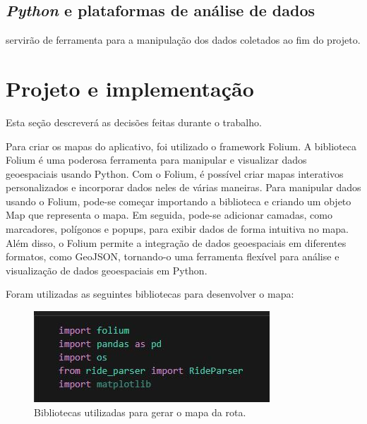      \subsection{\textit{Python} e plataformas de análise de dados} servirão de ferramenta para a manipulação dos dados coletados ao fim do projeto.


\section{Projeto e implementação}
Esta seção descreverá as decisões feitas durante o trabalho.

Para criar os mapas do aplicativo, foi utilizado o framework Folium. A biblioteca Folium é uma poderosa ferramenta para manipular e visualizar dados geoespaciais usando Python. Com o Folium, é possível criar mapas interativos personalizados e incorporar dados neles de várias maneiras. Para manipular dados usando o Folium, pode-se começar importando a biblioteca e criando um objeto Map que representa o mapa. Em seguida, pode-se adicionar camadas, como marcadores, polígonos e popups, para exibir dados de forma intuitiva no mapa. Além disso, o Folium permite a integração de dados geoespaciais em diferentes formatos, como GeoJSON, tornando-o uma ferramenta flexível para análise e visualização de dados geoespaciais em Python.

Foram utilizadas as seguintes bibliotecas para desenvolver o mapa:

\begin{figure}[hp]
    \centering
    
    \includegraphics[scale=0.8]{figures/bibliotecas.jpg}
    
    \caption{Bibliotecas utilizadas para gerar o mapa da rota.}
    
    \label{fig:python_libs}
\end{figure}


